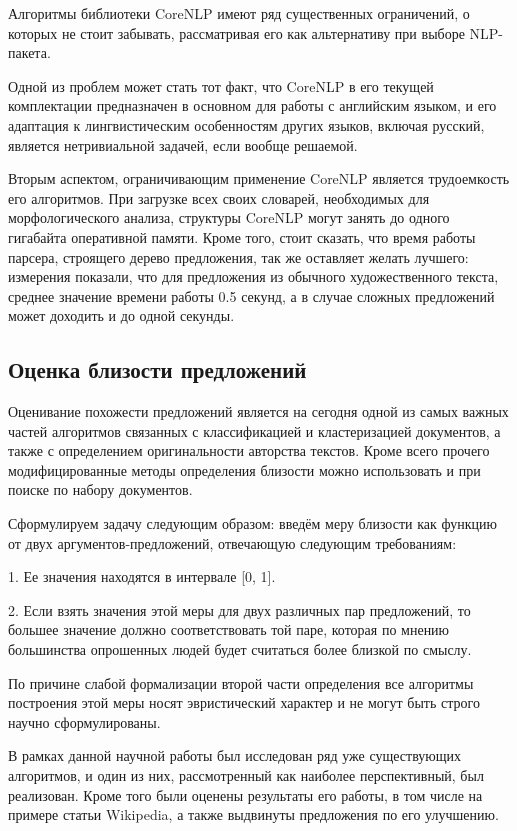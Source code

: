 Алгоритмы библиотеки CoreNLP имеют ряд существенных ограничений, 
о которых не стоит забывать, рассматривая его как альтернативу
при выборе NLP-пакета.

Одной из проблем может стать тот факт, что CoreNLP в его текущей комплектации
предназначен в основном для работы с английским языком, 
и его адаптация к лингвистическим особенностям других языков, включая русский,
является нетривиальной задачей, если вообще решаемой.

Вторым аспектом, ограничивающим применение CoreNLP является трудоемкость
его алгоритмов. При загрузке всех своих словарей, необходимых для морфологического
анализа, структуры CoreNLP могут занять до одного гигабайта оперативной памяти.
Кроме того, стоит сказать, что время работы парсера, строящего дерево предложения,
так же оставляет желать лучшего: измерения показали, что для предложения
из обычного художественного текста, среднее значение времени работы 0.5 секунд,
а в случае сложных предложений может доходить и до одной секунды.

\subsection{Оценка близости предложений}
Оценивание похожести предложений является на сегодня одной из самых важных
частей алгоритмов связанных с классификацией и кластеризацией документов, а также
с определением оригинальности авторства текстов. Кроме всего прочего модифицированные методы определения
близости можно использовать и при поиске по набору документов.

Сформулируем задачу следующим образом:
введём меру близости как функцию от двух аргументов-предложений, отвечающую следующим требованиям:

1. Ее значения находятся в интервале [0, 1].

2. Если взять значения этой меры для двух различных пар предложений, 
то большее значение должно соответствовать той паре, которая по мнению
большинства опрошенных людей будет считаться более близкой по смыслу.

По причине слабой формализации второй части определения все алгоритмы 
построения этой меры носят эвристический характер и не могут быть строго научно сформулированы.

В рамках данной научной работы был исследован ряд уже существующих алгоритмов,
и один из них, рассмотренный как наиболее перспективный, был реализован.
Кроме того были оценены результаты его работы, в том числе на примере статьи Wikipedia, 
а также выдвинуты предложения по его улучшению.

